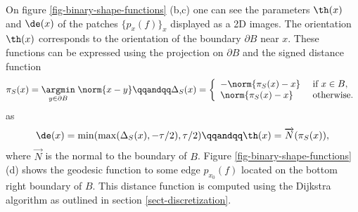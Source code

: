 On figure \ref{fig-binary-shape-functions} (b,c) one can see the parameters $\th(x)$ and $\de(x)$ of the patches $\{p_x(f)\}_x$ displayed as a 2D images. The orientation $\th(x)$ corresponds to the orientation of the boundary $\partial B$ near $x$. These functions can be expressed using the projection on  $\partial B$ and the signed distance function 
\begin{equation*}
	\pi_S(x) = \underset{y \in \partial B}{\argmin} \; \norm{x-y}
	\qqandqq 
	\Delta_S(x) = 
	\left\{
	\begin{array}{lll}
		-\norm{\pi_S(x)-x} & \text{ if } x \in B, \\
		\norm{\pi_S(x)-x} & \text{ otherwise.}
	\end{array}
	\right.
\end{equation*}
as 
\begin{equation*}
	\de(x) = \min(\max(\Delta_S(x),-\tau/2),\tau/2)
	\qqandqq
	\th(x) = \overrightarrow{N}(\pi_S(x)),
\end{equation*}
where $\overrightarrow{N}$ is the normal to the boundary of $B$. Figure \ref{fig-binary-shape-functions} (d) shows the geodesic function to some edge $p_{x_0}(f)$ located on the bottom right boundary of $B$. This distance function is computed using the Dijkstra algorithm as outlined in section \ref{sect-discretization}.



